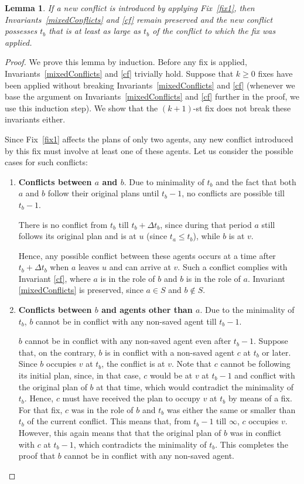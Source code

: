 \documentclass[a4paper,12pt]{article}
\newtheorem{lemma}{Lemma}
\newcommand{\Le}[1]{\begin{lemma}{\em #1}\end{lemma}}
\begin{document}
\Le{If a new conflict is introduced by applying Fix~\ref{fix1}, then Invariants~\ref{mixedConflicts} and \ref{cf} remain preserved and the new conflict possesses $t_b$ that is at least as large as $t_b$ of the conflict to which the fix was applied.\label{l1}}
\begin{proof}
We prove this lemma by induction. Before any fix is applied, Invariants~\ref{mixedConflicts} and \ref{cf} trivially hold. Suppose that $k\ge 0$ fixes have been applied without breaking Invariants~\ref{mixedConflicts} and \ref{cf} (whenever we base the argument on Invariants~\ref{mixedConflicts} and \ref{cf} further in the proof, we use this induction step). We show that the $(k+1)$-st fix does not break these invariants either.
 
Since Fix~\ref{fix1} affects the plans of only two agents, any new conflict introduced by this fix must involve at least one of these agents. Let us consider the possible cases for such conflicts:
\begin{enumerate}
\item {\bf Conflicts between $a$ and $b$}. Due to minimality of $t_b$ and the fact that both $a$ and $b$ follow their original plans until $t_b-1$, no conflicts are possible till $t_b-1$. 

There is no conflict from $t_b$ till $t_b+\Delta t_b$, since during that period $a$ still follows its original plan and is at $u$ (since $t_a\le t_b$), while $b$ is at $v$. 

Hence, any possible conflict between these agents occurs at a time after $t_b+\Delta t_b$ when $a$ leaves $u$ and can arrive at $v$. Such a conflict complies with Invariant \ref{cf}, where $a$ is in the role of $b$ and $b$ is in the role of $a$. Invariant \ref{mixedConflicts} is preserved, since $a\in S$ and $b\notin S$.
  
\item {\bf Conflicts between $b$ and agents other than $a$}. Due to the minimality of $t_b$, $b$ cannot be in conflict with any non-saved agent till $t_b-1$.

$b$ cannot be in conflict with any non-saved agent even after $t_b-1$. Suppose that, on the contrary, $b$ is in conflict with a non-saved agent $c$ at $t_b$ or later. Since $b$ occupies $v$ at $t_b$, the conflict is at $v$. Note that $c$ cannot be following its initial plan, since, in that case, $c$ would be at $v$ at $t_b-1$ and conflict with the original plan of $b$ at that time, which would contradict the minimality of $t_b$. Hence, $c$ must have received the plan to occupy $v$ at $t_b$ by means of a fix. For that fix, $c$ was in the role of $b$ and $t_b$ was either the same or smaller than $t_b$ of the current conflict. This means that, from $t_b-1$ till $\infty$, $c$ occupies $v$. However, this again means that that the original plan of $b$ was in conflict with $c$ at $t_b-1$, which contradicts the minimality of $t_b$. This completes the proof that $b$ cannot be in conflict with any non-saved agent.  


\end{enumerate}
\end{proof}
\end{document}
